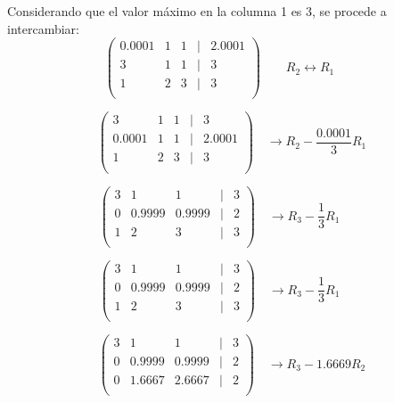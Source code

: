 \begin{enumerate}
            Considerando que el valor máximo en la columna 1 es 3, se procede a intercambiar:\\
            
            \[ \left( \begin{array}{ccccc}
                 0.0001 & 1 & 1 & | & 2.0001    \\
                 3      & 1 & 1 & | & 3         \\
                 1      & 2 & 3 & | & 3         \\
            \end{array}
            \right) \quad \quad R_2 \longleftrightarrow R_1 \quad \quad 
            \]
            
            \[ \left( \begin{array}{ccccc}
                 3      & 1 & 1 & | & 3         \\
                 0.0001 & 1 & 1 & | & 2.0001    \\
                 1      & 2 & 3 & | & 3         \\
            \end{array}
            \right) \quad \rightarrow R_2 - \frac{0.0001}{3}R_1 
            \]
            
            \[ \left( \begin{array}{ccccc}
                 3      & 1         & 1         & | & 3         \\
                 0      & 0.9999    & 0.9999    & | & 2         \\
                 1      & 2         & 3         & | & 3         \\
            \end{array}
            \right) \quad \rightarrow R_3 - \frac{1}{3}R_1 \quad \quad
            \]
            
            \[ \left( \begin{array}{ccccc}
                 3      & 1         & 1         & | & 3         \\
                 0      & 0.9999    & 0.9999    & | & 2         \\
                 1      & 2         & 3         & | & 3         \\
            \end{array}
            \right) \quad \rightarrow R_3 - \frac{1}{3}R_1 \quad \quad
            \]
            
            \[ \left( \begin{array}{ccccc}
                 3      & 1         & 1         & | & 3         \\
                 0      & 0.9999    & 0.9999    & | & 2         \\
                 0      & 1.6667    & 2.6667    & | & 2         \\
            \end{array}
            \right) \quad \rightarrow R_3 - 1.6669R_2 
            \]
            

\end{enumerate}
